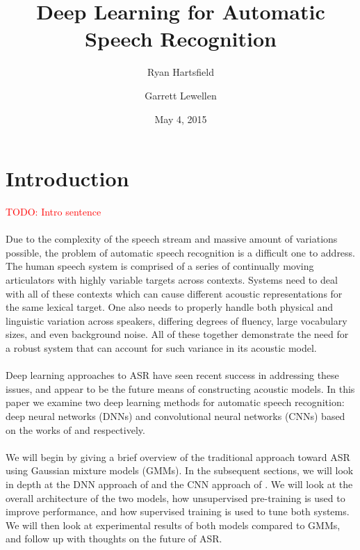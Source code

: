 \documentclass[letterpaper]{article}
\newcommand{\TODO}[1]{\textcolor{red}{TODO: #1}}
\begin{document}
\title{Deep Learning for Automatic Speech Recognition}
\author{Ryan Hartsfield \and Garrett Lewellen}
\date{May 4, 2015}

\maketitle

\doublespacing

\section*{Introduction} \TODO{Intro sentence}

\paragraph{} Due to the complexity of the speech stream and massive amount of variations possible, the problem of automatic speech recognition is a difficult one to address. The human speech system is comprised of a series of continually moving articulators with highly variable targets across contexts. Systems need to deal with all of these contexts which can cause different acoustic representations for the same lexical target. One also needs to properly handle both physical and linguistic variation across speakers, differing degrees of fluency, large vocabulary sizes, and even background noise. All of these together demonstrate the need for a robust system that can account for such variance in its acoustic model.

\paragraph{} Deep learning approaches to ASR have seen recent success in addressing these issues, and appear to be the future means of constructing acoustic models. In this paper we examine two deep learning methods for automatic speech recognition: deep neural networks (DNNs) and convolutional neural networks (CNNs) based on the works of \cite{DBLP:journals/taslp/DahlYDA12} and  \cite{DBLP:journals/taslp/Abdel-HamidMJDPY14} respectively. 

\paragraph{} We will begin by giving a brief overview of the traditional approach toward ASR using Gaussian mixture models (GMMs). In the subsequent sections, we will look in depth at the DNN approach of \cite{DBLP:journals/taslp/DahlYDA12} and the CNN approach of \cite{DBLP:journals/taslp/Abdel-HamidMJDPY14}. We will look at the overall architecture of the two models, how unsupervised pre-training is used to improve performance, and how supervised training is used to tune both systems. We will then look at experimental results of both models compared to GMMs, and follow up with thoughts on the future of ASR. 
\end{document}
